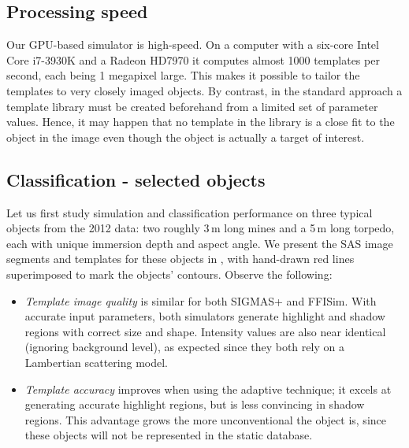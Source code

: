 \subsection{Processing speed}

%


Our GPU-based simulator is high-speed. On a computer with a six-core Intel Core i7-3930K and a Radeon HD7970 it computes almost 1000 templates per second, each being 1 megapixel large. This makes it possible to tailor the templates to very closely imaged objects. By contrast, in the standard approach a template library must be created beforehand from a limited set of parameter values. Hence, it may happen that no template in the library is a close fit to the object in the image even though the object is actually a target of interest.



\subsection{Classification - selected objects}


Let us first study simulation and classification performance on three typical objects from the 2012 data: two roughly 3\,m long mines and a 5\,m long torpedo, each with unique immersion depth and aspect angle. We present the SAS image segments and templates for these objects in , with hand-drawn red lines superimposed to mark the objects' contours. Observe the following:
%
\begin{itemize}
\item \emph{Template image quality} is similar for both SIGMAS+ and FFISim. With accurate input parameters, both simulators generate highlight and shadow regions with correct size and shape. Intensity values are also near identical (ignoring background level), as expected since they both rely on a Lambertian scattering model.
\item \emph{Template accuracy} improves when using the adaptive technique; it excels at generating accurate highlight regions, but is less convincing in shadow regions. This advantage grows the more unconventional the object is, since these objects will not be represented in the static database.
\end{itemize}



